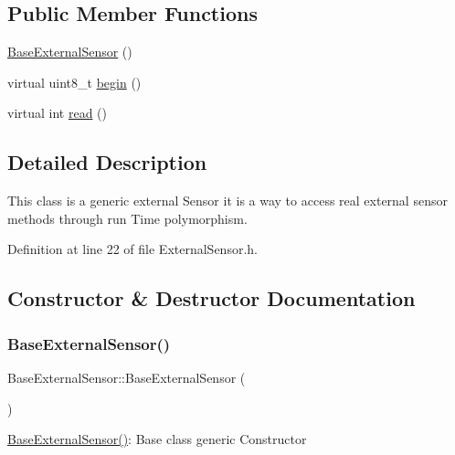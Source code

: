 \subsection*{Public Member Functions}
\begin{DoxyCompactItemize}
\item 
\hyperlink{class_base_external_sensor_a978d96a6563b646efb358c2790a9fc6f}{Base\+External\+Sensor} ()
\item 
virtual uint8\+\_\+t \hyperlink{class_base_external_sensor_a87d132803d4f4fdd4e66332809f0c9a0}{begin} ()
\item 
virtual int \hyperlink{class_base_external_sensor_a7e0a98f350148d7645031315657aa5ec}{read} ()
\end{DoxyCompactItemize}


\subsection{Detailed Description}
This class is a generic external Sensor it is a way to access real external sensor methods through run Time polymorphism. 

Definition at line 22 of file External\+Sensor.\+h.



\subsection{Constructor \& Destructor Documentation}
\mbox{\label{class_base_external_sensor_a978d96a6563b646efb358c2790a9fc6f}} 
\subsubsection{\texorpdfstring{Base\+External\+Sensor()}{BaseExternalSensor()}}
{\footnotesize\ttfamily Base\+External\+Sensor\+::\+Base\+External\+Sensor (\begin{DoxyParamCaption}{ }\end{DoxyParamCaption})\hspace{0.3cm}{\ttfamily [inline]}}

\hyperlink{class_base_external_sensor_a978d96a6563b646efb358c2790a9fc6f}{Base\+External\+Sensor()}\+: Base class generic Constructor 

